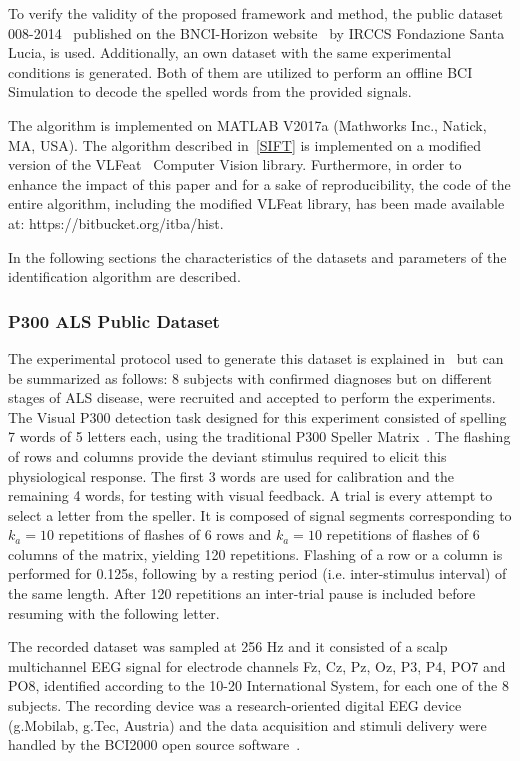 \documentclass[utf8]{frontiersSCNS} %
\begin{document}
To verify the validity of the proposed framework and method, the public dataset 008-2014~\citep{Riccio2013} published on the BNCI-Horizon website~\citep{Brunner2014} by  IRCCS Fondazione Santa Lucia, is used. Additionally, an own dataset with the same experimental conditions is generated. Both of them are utilized to perform an offline BCI Simulation to decode the spelled words from the provided signals. 

The algorithm is implemented on MATLAB V2017a (Mathworks Inc., Natick, MA, USA). The algorithm described in~\ref{SIFT} is implemented on a modified version of the  VLFeat~\citep{Vedaldi2010} Computer Vision library.   Furthermore, in order to enhance the impact of this paper and for a sake of reproducibility, the code of the entire algorithm, including the modified VLFeat library, has been made available at: https://bitbucket.org/itba/hist.

In the following sections the characteristics of the datasets and parameters of the identification algorithm are described. 


\subsubsection{P300 ALS Public Dataset} \label{ALSDataset}

The experimental protocol used to generate this dataset is explained in~\citep{Riccio2013} but can be summarized as follows:  8 subjects with confirmed diagnoses but on different stages of ALS disease, were recruited and accepted to perform the experiments. The Visual P300 detection task designed for this experiment consisted of spelling 7 words of 5 letters each, using the traditional P300 Speller Matrix~\citep{Farwell1988}. The flashing of rows and columns provide the deviant stimulus required to elicit this physiological response.  The first 3 words are used for calibration and the remaining 4 words, for testing with visual feedback.  A trial is every attempt to select a letter from the speller. It is composed of signal segments corresponding to $k_a =10$ repetitions of flashes of 6 rows and $k_a =10$ repetitions of flashes of 6 columns of the matrix, yielding 120 repetitions.  Flashing of a row or a column is performed for 0.125s, following by a resting period (i.e. inter-stimulus interval) of the same length.  After 120 repetitions an inter-trial pause is included before resuming with the following letter.

The recorded dataset was sampled at 256 Hz and it consisted of a scalp multichannel EEG signal for electrode channels Fz, Cz, Pz, Oz, P3, P4, PO7 and PO8, identified according to the 10-20 International System,  for each one of the 8 subjects.   The recording device was a research-oriented digital EEG device (g.Mobilab, g.Tec, Austria) and the data acquisition and stimuli delivery were handled by the BCI2000 open source software~\citep{Schalk2004}.
\end{document}
